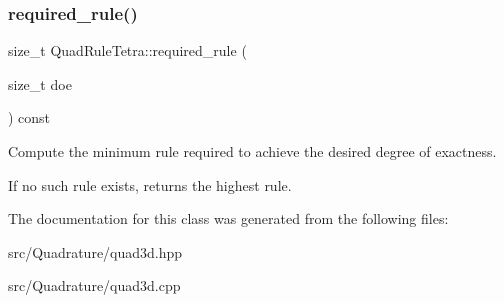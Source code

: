\subsubsection{\texorpdfstring{required\+\_\+rule()}{required\_rule()}}
{\footnotesize\ttfamily size\+\_\+t Quad\+Rule\+Tetra\+::required\+\_\+rule (\begin{DoxyParamCaption}\item[{size\+\_\+t}]{doe }\end{DoxyParamCaption}) const\hspace{0.3cm}{\ttfamily [protected]}}



Compute the minimum rule required to achieve the desired degree of exactness. 

If no such rule exists, returns the highest rule. 

The documentation for this class was generated from the following files\+:\begin{DoxyCompactItemize}
\item 
src/\+Quadrature/quad3d.\+hpp\item 
src/\+Quadrature/quad3d.\+cpp\end{DoxyCompactItemize}
